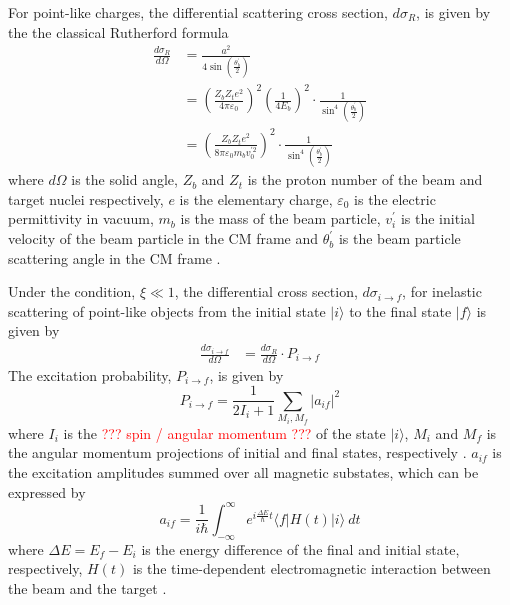 \documentclass[twoside,english]{uiofysmaster/uiofysmaster}
\begin{document}
For point-like charges, the differential scattering cross section, $d\sigma_R$, is given by the the classical Rutherford formula
\begin{align}
	\frac{d\sigma_R}{d\Omega} 
	&= \frac{a^2}{4 \sin \left( \tfrac{\theta_b^{'}}{2} \right)} \nonumber \\
	&= \left( \frac{Z_b Z_t e^2}{4\pi \varepsilon_0}  \right)^2 \left( \frac{1}{4 E_b}  \right)^2 \cdot \frac{1}{\sin^4 \left( \frac{\theta_b^{'}}{2} \right)} \nonumber \\	
	&= \left( \frac{Z_b Z_t e^2}{8 \pi \varepsilon_0 m_b v_0^{' 2}} \right)^2 \cdot \frac{1}{\sin^4 \left( \frac{\theta_b^{'}}{2} \right)} 
\end{align}
where $d\Omega$ is the solid angle, $Z_b$ and $Z_t$ is the proton number of the beam and target nuclei respectively, $e$ is the elementary charge, $\varepsilon_0$ is the electric permittivity in vacuum, $m_b$ is the mass of the beam particle, $v_i^{'}$ is the initial velocity of the beam particle in the CM frame and $\theta_b^{'}$ is the beam particle scattering angle in the CM frame \cite{Klintefjord, Krane, EE-Coulex}.

Under the condition, $\xi \ll 1$, the differential cross section, $d\sigma_{i \rightarrow f}$, for inelastic scattering of point-like objects from the initial state $|i\rangle$ to the final state $|f\rangle$ is given by 
\begin{align}
	\frac{d\sigma_{i \rightarrow f}}{d\Omega} 
	&= \frac{d\sigma_R}{d\Omega} \cdot P_{i \rightarrow f} 
\end{align}
The excitation probability, $P_{i \rightarrow f}$, is given by
\begin{equation}
	P_{i \rightarrow f} = \frac{1}{2I_i + 1} \sum_{M_i, M_f} | a_{if} |^2
\end{equation}
where $I_i$ is the \textcolor{red}{??? spin / angular momentum ???} of the state $|i\rangle$, $M_i$ and $M_f$ is the angular momentum projections of initial and final states, respectively \cite{EE-Coulex, NaR}.
$a_{if}$ is the excitation amplitudes summed over all magnetic substates, which can be expressed by
\begin{equation}
	a_{if} = \frac{1}{i\hbar} \int_{-\infty}^{\infty} e^{i \frac{\Delta E}{\hbar} t} \langle f | H(t) | i \rangle ~dt
\end{equation}
where $\Delta E = E_f - E_i$ is the energy difference of the final and initial state, respectively, $H(t)$ is the time-dependent electromagnetic interaction between the beam and the target \cite{Klintefjord, Niedermaier, NaR}.
\end{document}
